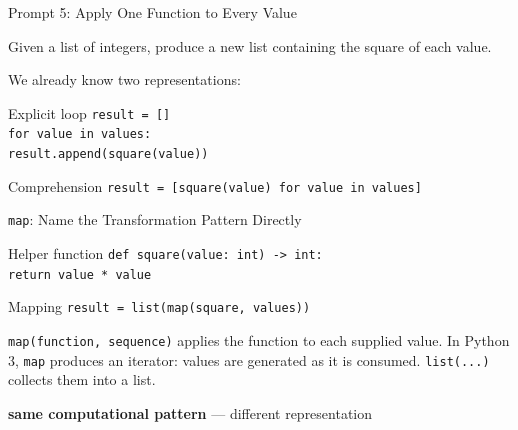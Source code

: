 \documentclass[aspectratio=169,10pt]{beamer}
\begin{document}

\begin{frame}{Prompt 5: Apply One Function to Every Value}
  \begin{activity}
    Given a list of integers, produce a new list containing the square of each value.
  \end{activity}

  We already know two representations:

  \begin{block}{Explicit loop}
    \texttt{result = []}\\
    \texttt{for value in values:}\\
    \hspace*{0.20in}\texttt{result.append(square(value))}
  \end{block}

  \begin{block}{Comprehension}
    \texttt{result = [square(value) for value in values]}
  \end{block}
\end{frame}

\begin{frame}{\texttt{map}: Name the Transformation Pattern Directly}
  \begin{block}{Helper function}
    \texttt{def square(value: int) -> int:}\\
    \hspace*{0.20in}\texttt{return value * value}
  \end{block}

  \begin{block}{Mapping}
    \texttt{result = list(map(square, values))}
  \end{block}

  \begin{cpdefinition}
    \texttt{map(function, sequence)} applies the function to each supplied value. In Python 3, \texttt{map} produces an iterator: values are generated as it is consumed. \texttt{list(...)} collects them into a list.
  \end{cpdefinition}

  \begin{center}
    \textbf{same computational pattern} --- different representation
  \end{center}
\end{frame}
\end{document}
